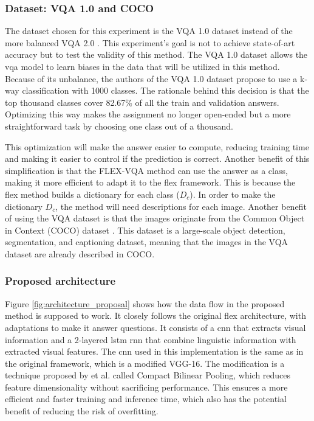         \subsubsection{Dataset: VQA 1.0 and COCO}
        The dataset chosen for this experiment is the VQA 1.0 dataset \cite{agrawalVQAVisualQuestion2016} instead of the more balanced VQA 2.0 \cite{goyalMakingVQAMatter2017}. 
        This experiment's goal is not to achieve state-of-art accuracy but to test the validity of this method. The VQA 1.0 dataset allows the \gls{vqa} model to learn biases in the data that will be utilized in this method. Because of its unbalance, the authors of the VQA 1.0 dataset propose to use a k-way classification with 1000 classes. The rationale behind this decision is that the top thousand classes cover 82.67\% of all the train and validation answers. Optimizing this way makes the assignment no longer open-ended but a more straightforward task by choosing one class out of a thousand. 
        
        This optimization will make the answer easier to compute, reducing training time and making it easier to control if the prediction is correct. Another benefit of this simplification is that the FLEX-VQA method can use the answer as a class, making it more efficient to adapt it to the \gls{flex} framework. This is because the \gls{flex} method builds a dictionary for each class ($D_c$). 
        In order to make the dictionary $D_c$, the method will need descriptions for each image. 
        Another benefit of using the VQA dataset is that the images originate from the Common Object in Context (COCO) dataset \cite{linMicrosoftCOCOCommon2015}. This dataset is a large-scale object detection, segmentation, and captioning dataset, meaning that the images in the VQA dataset are already described in COCO. 
       

        \subsubsection{Proposed architecture}
        \label{sec3:proposed_architecture}
        
        Figure \ref{fig:architecture_proposal} shows how the data flow in the proposed method is supposed to work. It closely follows the original \gls{flex} architecture, with adaptations to make it answer questions. It consists of a \gls{cnn} that extracts visual information and a 2-layered \gls{lstm} \cite{hochreiterLongShorttermMemory1997} \gls{rnn} that combine linguistic information with extracted visual features. 
        The \gls{cnn} used in this implementation is the same as in the original framework, which is a modified VGG-16. The modification is a technique proposed by \cite{gaoCompactBilinearPooling2016} et al. called Compact Bilinear Pooling, which reduces feature dimensionality without sacrificing performance. This ensures a more efficient and faster training and inference time, which also has the potential benefit of reducing the risk of overfitting.


